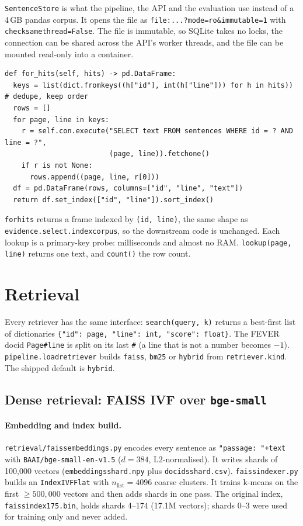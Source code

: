 \documentclass[11pt,a4paper]{article}
\makeatletter
\DeclareRobustCommand{\_}{\ifmmode\nfss@text{\textunderscore}\else\textunderscore\allowbreak\fi}
\newcommand{\file}[1]{\texttt{#1}}
\makeatother
\begin{document}
\texttt{SentenceStore} is what the pipeline, the API and the evaluation use instead of a 4\,GB pandas corpus.
It opens the file as \texttt{file:...?mode=ro\&immutable=1} with \texttt{check\_same\_thread=False}. The file is
immutable, so SQLite takes no locks, the connection can be shared across the API's worker threads, and the file
can be mounted read-only into a container.

\begin{lstlisting}
def for_hits(self, hits) -> pd.DataFrame:
  keys = list(dict.fromkeys((h["id"], int(h["line"])) for h in hits))   # dedupe, keep order
  rows = []
  for page, line in keys:
    r = self.con.execute("SELECT text FROM sentences WHERE id = ? AND line = ?",
                         (page, line)).fetchone()
    if r is not None:
      rows.append((page, line, r[0]))
  df = pd.DataFrame(rows, columns=["id", "line", "text"])
  return df.set_index(["id", "line"]).sort_index()
\end{lstlisting}

\texttt{for\_hits} returns a frame indexed by \texttt{(id, line)}, the same shape as \texttt{evidence.select.index\_corpus},
so the downstream code is unchanged. Each lookup is a primary-key probe: milliseconds and almost no RAM.
\texttt{lookup(page, line)} returns one text, and \texttt{count()} the row count.

\section{Retrieval}

Every retriever has the same interface: \texttt{search(query, k)} returns a best-first list of dictionaries
\texttt{\{"id": page, "line": int, "score": float\}}. The FEVER docid \texttt{Page\#line} is split on its last
\texttt{\#} (a line that is not a number becomes $-1$). \file{pipeline.load\_retriever} builds \texttt{faiss},
\texttt{bm25} or \texttt{hybrid} from \texttt{retriever.kind}. The shipped default is \texttt{hybrid}.

\subsection{Dense retrieval: FAISS IVF over \texttt{bge-small}}

\paragraph{Embedding and index build.} \file{retrieval/faiss\_embeddings.py} encodes every sentence as
\texttt{"passage: "+text} with \texttt{BAAI/bge-small-en-v1.5} ($d=384$, L2-normalised). It writes shards of 100{,}000
vectors (\texttt{embeddings\_shard\_*.npy} plus \texttt{docids\_shard\_*.csv}). \file{faiss\_indexer.py} builds an
\texttt{IndexIVFFlat} with $n_\text{list}=4096$ coarse clusters. It trains k-means on the first $\ge 500{,}000$
vectors and then adds shards in one pass. The original index, \file{faiss\_index\_175.bin}, holds shards 4--174
(17.1M vectors); shards 0--3 were used for training only and never added.
\end{document}
